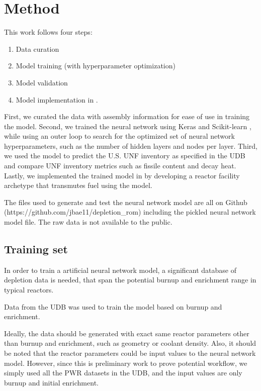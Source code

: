 \section{Method}

This work follows four steps:

\begin{enumerate}
\item Data curation
\item Model training (with hyperparameter optimization)
\item Model validation
\item Model implementation in \Cyclus.
\end{enumerate}


First, we curated the
data with assembly information for ease of use in training the model.
Second, we trained the neural network using Keras \cite{collet_keras_2015}
and Scikit-learn \cite{pedregosa_scikit-learn_2011},
while using an outer loop to
search for the optimized set of neural network hyperparameters,
such as the number of hidden layers and nodes per layer.
Third, we used the model to predict the U.S. \gls{UNF}
inventory as specified in the \gls{UDB} and compare
\gls{UNF} inventory metrics such as fissile content
and decay heat. Lastly, we implemented the trained
model in \Cyclus by developing a reactor facility archetype
that transmutes fuel using the model.

The files used to generate and test the neural network
model are all on Github (https://github.com/jbae11/depletion\_rom)
including the pickled neural network model file. The raw data
is not available to the public.

\subsection{Training set}

In order to train a artificial neural network model, a significant database of
depletion data is needed, that span the potential
burnup and enrichment range in typical reactors.

Data from the \gls{UDB} was used to train the model 
based on burnup and enrichment. 

Ideally, the data should be generated with exact same reactor
parameters other than burnup and enrichment, such as geometry or
coolant density. Also, it should be noted that the reactor
parameters could be input values to the neural network model. However, since
this is preliminary work to prove potential workflow, we
simply used all the \gls{PWR} datasets in the \gls{UDB},
and the input values are only burnup and initial enrichment.

